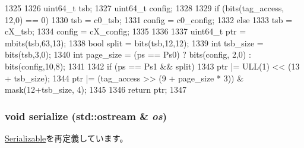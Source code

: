 \begin{DoxyCode}
1325 {
1326     uint64_t tsb;
1327     uint64_t config;
1328 
1329     if (bits(tag_access, 12,0) == 0) {
1330         tsb = c0_tsb;
1331         config = c0_config;
1332     } else {
1333         tsb = cX_tsb;
1334         config = cX_config;
1335     }
1336 
1337     uint64_t ptr = mbits(tsb,63,13);
1338     bool split = bits(tsb,12,12);
1339     int tsb_size = bits(tsb,3,0);
1340     int page_size = (ps == Ps0) ? bits(config, 2,0) : bits(config,10,8);
1341 
1342     if (ps == Ps1  && split)
1343         ptr |= ULL(1) << (13 + tsb_size);
1344     ptr |= (tag_access >> (9 + page_size * 3)) & mask(12+tsb_size, 4);
1345 
1346     return ptr;
1347 }
\end{DoxyCode}
\hypertarget{classSparcISA_1_1TLB_a53e036786d17361be4c7320d39c99b84}{
\subsubsection[{serialize}]{\setlength{\rightskip}{0pt plus 5cm}void serialize (std::ostream \& {\em os})}}
\label{classSparcISA_1_1TLB_a53e036786d17361be4c7320d39c99b84}


\hyperlink{classSerializable_ad6272f80ae37e8331e3969b3f072a801}{Serializable}を再定義しています。


